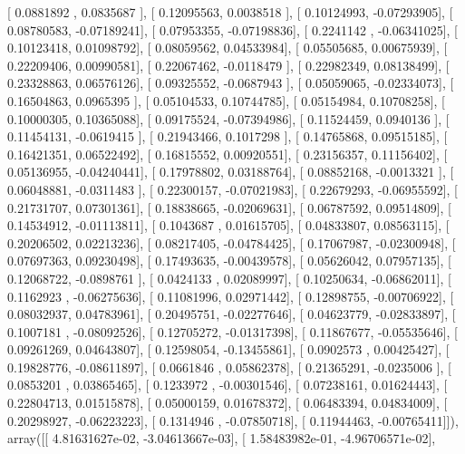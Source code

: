\documentclass{article}
\begin{document}
       [ 0.0881892 ,  0.0835687 ],
       [ 0.12095563,  0.0038518 ],
       [ 0.10124993, -0.07293905],
       [ 0.08780583, -0.07189241],
       [ 0.07953355, -0.07198836],
       [ 0.2241142 , -0.06341025],
       [ 0.10123418,  0.01098792],
       [ 0.08059562,  0.04533984],
       [ 0.05505685,  0.00675939],
       [ 0.22209406,  0.00990581],
       [ 0.22067462, -0.0118479 ],
       [ 0.22982349,  0.08138499],
       [ 0.23328863,  0.06576126],
       [ 0.09325552, -0.0687943 ],
       [ 0.05059065, -0.02334073],
       [ 0.16504863,  0.0965395 ],
       [ 0.05104533,  0.10744785],
       [ 0.05154984,  0.10708258],
       [ 0.10000305,  0.10365088],
       [ 0.09175524, -0.07394986],
       [ 0.11524459,  0.0940136 ],
       [ 0.11454131, -0.0619415 ],
       [ 0.21943466,  0.1017298 ],
       [ 0.14765868,  0.09515185],
       [ 0.16421351,  0.06522492],
       [ 0.16815552,  0.00920551],
       [ 0.23156357,  0.11156402],
       [ 0.05136955, -0.04240441],
       [ 0.17978802,  0.03188764],
       [ 0.08852168, -0.0013321 ],
       [ 0.06048881, -0.0311483 ],
       [ 0.22300157, -0.07021983],
       [ 0.22679293, -0.06955592],
       [ 0.21731707,  0.07301361],
       [ 0.18838665, -0.02069631],
       [ 0.06787592,  0.09514809],
       [ 0.14534912, -0.01113811],
       [ 0.1043687 ,  0.01615705],
       [ 0.04833807,  0.08563115],
       [ 0.20206502,  0.02213236],
       [ 0.08217405, -0.04784425],
       [ 0.17067987, -0.02300948],
       [ 0.07697363,  0.09230498],
       [ 0.17493635, -0.00439578],
       [ 0.05626042,  0.07957135],
       [ 0.12068722, -0.0898761 ],
       [ 0.0424133 ,  0.02089997],
       [ 0.10250634, -0.06862011],
       [ 0.1162923 , -0.06275636],
       [ 0.11081996,  0.02971442],
       [ 0.12898755, -0.00706922],
       [ 0.08032937,  0.04783961],
       [ 0.20495751, -0.02277646],
       [ 0.04623779, -0.02833897],
       [ 0.1007181 , -0.08092526],
       [ 0.12705272, -0.01317398],
       [ 0.11867677, -0.05535646],
       [ 0.09261269,  0.04643807],
       [ 0.12598054, -0.13455861],
       [ 0.0902573 ,  0.00425427],
       [ 0.19828776, -0.08611897],
       [ 0.0661846 ,  0.05862378],
       [ 0.21365291, -0.0235006 ],
       [ 0.0853201 ,  0.03865465],
       [ 0.1233972 , -0.00301546],
       [ 0.07238161,  0.01624443],
       [ 0.22804713,  0.01515878],
       [ 0.05000159,  0.01678372],
       [ 0.06483394,  0.04834009],
       [ 0.20298927, -0.06223223],
       [ 0.1314946 , -0.07850718],
       [ 0.11944463, -0.00765411]]), array([[  4.81631627e-02,  -3.04613667e-03],
       [  1.58483982e-01,  -4.96706571e-02],
\end{document}
